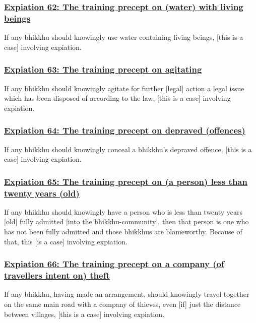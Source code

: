 \subsubsection*{\hyperref[pac62]{Expiation 62: The training precept on (water) with living beings}}
\label{exp62}
If any bhikkhu should knowingly use water containing living beings, [this is a case] involving expiation.



\subsubsection*{\hyperref[pac63]{Expiation 63: The training precept on agitating}}
\label{exp63}
If any bhikkhu should knowingly agitate for further [legal] action a legal issue which has been disposed of according to the law, [this is a case] involving expiation.



\subsubsection*{\hyperref[pac64]{Expiation 64: The training precept on depraved (offences)}}
\label{exp64}
If any bhikkhu should knowingly conceal a bhikkhu's depraved offence, [this is a case] involving expiation.



\subsubsection*{\hyperref[pac65]{Expiation 65: The training precept on (a person) less than twenty years (old)}}
\label{exp65}
If any bhikkhu should knowingly have a person who is less than twenty years [old] fully admitted [into the bhikkhu-community], then that person is one who has not been fully admitted and those bhikkhus are blameworthy. Because of that, this [is a case] involving expiation.



\subsubsection*{\hyperref[pac66]{Expiation 66: The training precept on a company (of travellers intent on) theft}}
\label{exp66}
If any bhikkhu, having made an arrangement, should knowingly travel together on the same main road with a company of thieves, even [if] just the distance between villages, [this is a case] involving expiation.




